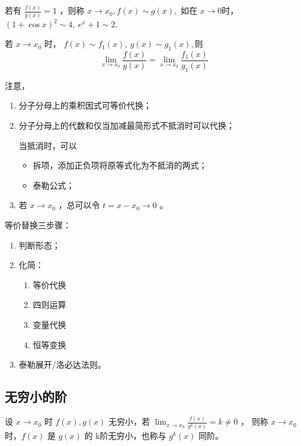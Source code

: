 \begin{Field}[广义等价]

    若有 $ \displaystyle\frac{f(x)}{g(x)}=1 $ ，则称 $ x\rightarrow x_0, f(x)\sim g(x), $ 
    如在 $ x\rightarrow0 $时，$ (1+\cos x)^2 \sim 4,\ e^x+1\sim 2.$
\end{Field}

\begin{Def}[广义等价替换定理]

    若 $ x\rightarrow x_0 $ 时， $ f(x)\sim f_1(x),\ g(x)\sim g_1(x), $则$$
        \lim_{x\rightarrow x_0}\frac{f(x)}{g(x)}=\lim_{x\rightarrow x_0}\frac{f_1(x)}{g_1(x)}
    $$ 
\end{Def}

注意，
\begin{enumerate}
    \item 分子分母上的乘积因式可等价代换；
    \item 分子分母上的代数和仅当加减最简形式不抵消时可以代换；
    
    当抵消时，可以
    \begin{itemize}
        \item 拆项，添加正负项将原等式化为不抵消的两式；
        \item 泰勒公式；
    \end{itemize}
    \item 若 $ x\rightarrow x_0 $ ，总可以令 $ t=x-x_0\rightarrow0 $ 。
\end{enumerate}

等价替换三步骤：
\begin{enumerate}
    \item 判断形态；
    \item 化简：
    \begin{enumerate}
        \item 等价代换
        \item 四则运算
        \item 变量代换
        \item 恒等变换
    \end{enumerate}
    \item 泰勒展开/洛必达法则。
\end{enumerate}

\subsection{无穷小的阶}

\begin{Def}[无穷小阶的定义]

    设 $ x\rightarrow x_0 $ 时 $ f(x),g(x) $ 无穷小，若
    $ \displaystyle\lim_{x\rightarrow x_0}\frac{f(x)}{g^k(x)}=k\neq0 $ ，
    则称 $ x\rightarrow x_0 $ 时，$ f(x) $ 是 $ g(x) $ 的 k阶无穷小，也称与 $ g^k(x) $ 同阶。
\end{Def}

